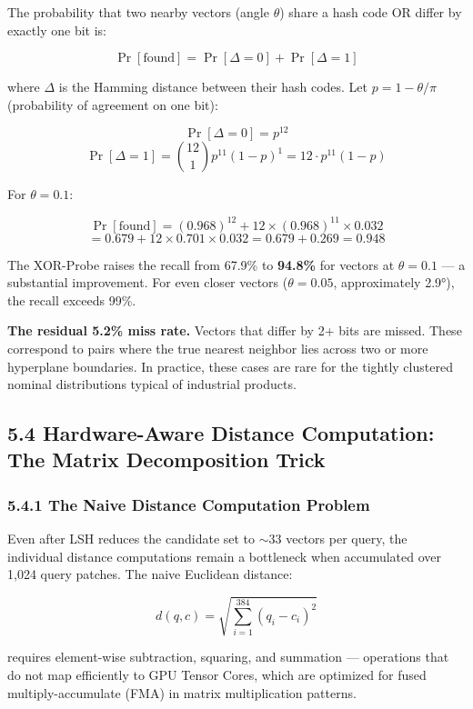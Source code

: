 \documentclass[12pt, a4paper, oneside]{report}
\begin{document}
The probability that two nearby vectors (angle \(\theta\)) share a hash code OR differ by exactly one bit is:

\[\Pr[\text{found}] = \Pr[\Delta = 0] + \Pr[\Delta = 1]\]

where \(\Delta\) is the Hamming distance between their hash codes. Let \(p = 1 - \theta/\pi\) (probability of agreement on one bit):

\[\Pr[\Delta = 0] = p^{12}\] \[\Pr[\Delta = 1] = \binom{12}{1} p^{11}(1-p)^1 = 12 \cdot p^{11}(1-p)\]

For \(\theta = 0.1\):

\[\Pr[\text{found}] = (0.968)^{12} + 12 \times (0.968)^{11} \times 0.032\] \[= 0.679 + 12 \times 0.701 \times 0.032 = 0.679 + 0.269 = 0.948\]

The XOR-Probe raises the recall from 67.9\% to \textbf{94.8\%} for vectors at \(\theta = 0.1\) --- a substantial improvement. For even closer vectors (\(\theta = 0.05\), approximately 2.9°), the recall exceeds 99\%.

\textbf{The residual 5.2\% miss rate.} Vectors that differ by 2+ bits are missed. These correspond to pairs where the true nearest neighbor lies across two or more hyperplane boundaries. In practice, these cases are rare for the tightly clustered nominal distributions typical of industrial products.

\bigskip\noindent\hrulefill\bigskip

\subsection{5.4 Hardware-Aware Distance Computation: The Matrix Decomposition Trick}\label{hardware-aware-distance-computation-the-matrix-decomposition-trick}

\subsubsection{5.4.1 The Naive Distance Computation Problem}\label{the-naive-distance-computation-problem}

Even after LSH reduces the candidate set to ${\sim}$33 vectors per query, the individual distance computations remain a bottleneck when accumulated over 1,024 query patches. The naive Euclidean distance:

\[d(q, c) = \sqrt{\sum_{i=1}^{384} (q_i - c_i)^2}\]

requires element-wise subtraction, squaring, and summation --- operations that do not map efficiently to GPU Tensor Cores, which are optimized for fused multiply-accumulate (FMA) in matrix multiplication patterns.
\end{document}

